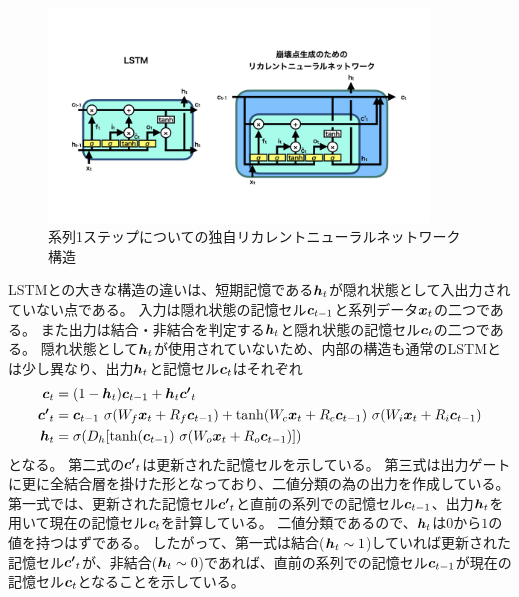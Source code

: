 \begin{figure}[htbp]
 \centering
 \includegraphics[trim = 0 100 0 200, width=0.9\textwidth, clip]{Figure/3Networks/3-4-1-2VLSTMStructure.png}
 \caption{系列1ステップについての独自リカレントニューラルネットワーク構造}
 \label{3-4-1-2VLSTMStructure}
\end{figure}

LSTMとの大きな構造の違いは、短期記憶である${\mbox{\boldmath{$h$}}}_t$が隠れ状態として入出力されていない点である。
入力は隠れ状態の記憶セル${\mbox{\boldmath{$c$}}}_{t-1}$と系列データ${\mbox{\boldmath{$x$}}}_t$の二つである。
また出力は結合・非結合を判定する${\mbox{\boldmath{$h$}}}_t$と隠れ状態の記憶セル${\mbox{\boldmath{$c$}}}_{t}$の二つである。
隠れ状態として${\mbox{\boldmath{$h$}}}_t$が使用されていないため、内部の構造も通常のLSTMとは少し異なり、出力${\mbox{\boldmath{$h$}}}_{t}$と記憶セル${\mbox{\boldmath{$c$}}}_{t}$はそれぞれ
\begin{equation}
 \begin{split}
  {\mbox{\boldmath{$c$}}}_{t} 
  &= (1-{\mbox{\boldmath{$h$}}}_t) {\mbox{\boldmath{$c$}}}_{t-1} + {\mbox{\boldmath{$h$}}}_t {\mbox{\boldmath{$c'$}}}_{t}\\
  {\mbox{\boldmath{$c'$}}}_{t}
  &= {\mbox{\boldmath{$c$}}}_{t-1} \  \sigma (W_f {\mbox{\boldmath{$x$}}}_t + R_f {\mbox{\boldmath{$c$}}}_{t-1}) 
  + \tanh (W_c {\mbox{\boldmath{$x$}}}_t + R_c {\mbox{\boldmath{$c$}}}_{t-1}) \  \sigma (W_i {\mbox{\boldmath{$x$}}}_t + R_i {\mbox{\boldmath{$c$}}}_{t-1})\\
  {\mbox{\boldmath{$h$}}}_{t} 
  &= \sigma (D_h [\tanh({\mbox{\boldmath{$c$}}}_{t-1}) \  \sigma (W_o {\mbox{\boldmath{$x$}}}_t + R_o {\mbox{\boldmath{$c$}}}_{t-1}) ])
 \end{split}
\end{equation}
となる。
第二式の${\mbox{\boldmath{$c'$}}}_{t}$は更新された記憶セルを示している。
第三式は出力ゲートに更に全結合層を掛けた形となっており、二値分類の為の出力を作成している。
第一式では、更新された記憶セル${\mbox{\boldmath{$c'$}}}_{t}$と直前の系列での記憶セル${\mbox{\boldmath{$c$}}}_{t-1}$、出力${\mbox{\boldmath{$h$}}}_{t}$を用いて現在の記憶セル${\mbox{\boldmath{$c$}}}_{t}$を計算している。
二値分類であるので、${\mbox{\boldmath{$h$}}}_{t}$は$0$から$1$の値を持つはずである。
したがって、第一式は結合(${\mbox{\boldmath{$h$}}}_{t} \sim 1$)していれば更新された記憶セル${\mbox{\boldmath{$c'$}}}_{t}$が、非結合(${\mbox{\boldmath{$h$}}}_{t} \sim 0$)であれば、直前の系列での記憶セル${\mbox{\boldmath{$c$}}}_{t-1}$が現在の記憶セル${\mbox{\boldmath{$c$}}}_{t}$となることを示している。

